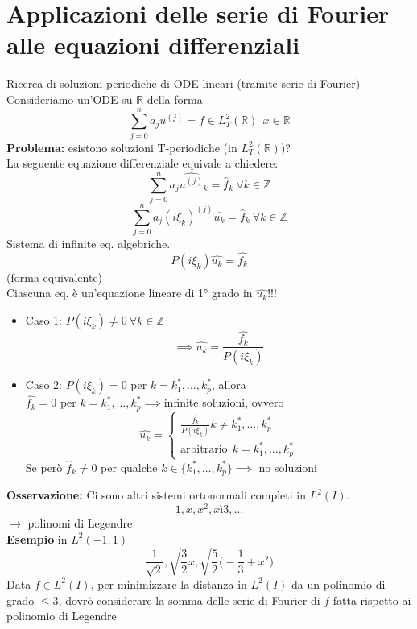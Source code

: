 \documentclass[a4paper]{article}
\newcommand{\R}{\mathbb{R}}
\newcommand{\Z}{\mathbb{Z}}
\begin{document}
\section{Applicazioni delle serie di Fourier alle equazioni differenziali}
Ricerca di soluzioni periodiche di ODE lineari (tramite serie di Fourier)
\\Consideriamo un'ODE su $\R$ della forma
\[\sum_{j=0}^{n} a_ju^{(j)}=f\in L^{2}_T(\R)\ \ x\in \R\]
\textbf{Problema:} esistono soluzioni T-periodiche (in $L^{2}_T(\R)$)?
\\La seguente equazione differenziale equivale a chiedere:
\[\sum_{j=0}^{n} a_j\widehat{u^{(j)}}_k=\hat{f}_k\ \forall k\in \Z\]
\[\sum_{j=0}^{n} a_j(i\xi_k)^{(j)}\hat{u_k}=\hat{f}_k\ \forall k\in \Z\]
Sistema di infinite eq. algebriche.
\[P(i\xi_k)\hat{u_k}=\hat{f_k}\]
(forma equivalente)
\\Ciascuna eq. è un'equazione lineare di 1° grado in $\hat{u_k}$!!!
\begin{itemize}
	\item Caso 1: $P(i\xi_k)\neq 0\ \forall k\in \Z$ 
		\[\implies \hat{u_k}=\frac{\hat{f_k}}{P(i\xi_k)}\]
	\item Caso 2: $P(i\xi_k)=0$ per $k=k_1^*,\ldots,k_p^*$, allora
		\\$\hat{f_k}=0$ per $k=k_1^*,\ldots,k_p^*\implies $infinite soluzioni, ovvero
		\[\hat{u_k}=\begin{cases}
		\frac{\hat{f_k}}{P(i\xi_k)} k\neq k_1^*,\ldots,k_p^*
	\\\text{arbitrario}\ \ k=k_1^*,\ldots,k_p^*

\end{cases}\]
Se però $\hat{f}_k\neq 0$ per qualche $k\in \{k_1^*,\ldots,k^*_p\} \implies $ no soluzioni
\end{itemize}
\textbf{Osservazione:} Ci sono altri sistemi ortonormali completi in $L^{2}(I)$.
\[1,x,x^2,xì3,\ldots\]
$\to $ polinomi di Legendre\\
\textbf{Esempio} in $L^2(-1,1)$ 
\[\frac{1}{\sqrt{2} }, \sqrt{\frac{3}{2}} x, \sqrt{\frac{5}{2}} \bigg(-\frac{1}{3}+x^2\bigg)\]
Data $f\in L^{2}(I)$, per minimizzare la distanza in $L^{2}(I)$ da un polinomio di grado $\le 3$, dovrò considerare la somma delle serie di Fourier di  $f$ fatta rispetto ai polinomio di Legendre
\end{document}
